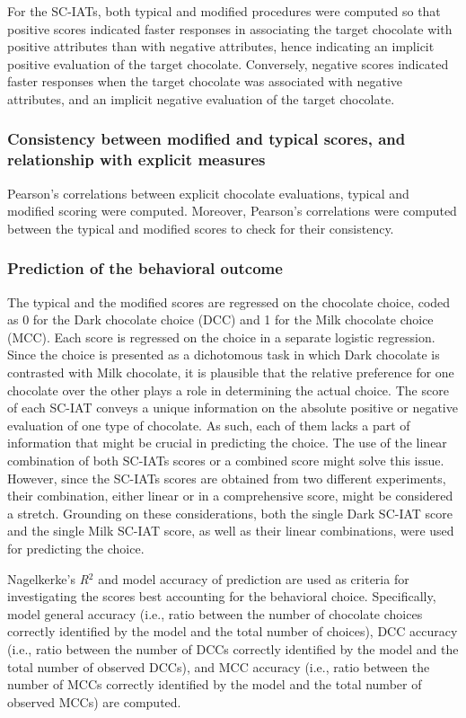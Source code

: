 \documentclass[12pt]{book}
\begin{document}
For the SC-IATs, both typical and modified procedures were computed so that positive scores indicated faster responses in associating the target chocolate with positive attributes than with negative attributes, hence indicating an implicit positive evaluation of the target chocolate. Conversely, negative scores indicated faster responses when the target chocolate was associated with negative attributes, and an implicit negative evaluation of the target chocolate.

\subsubsection{Consistency between modified and typical scores, and relationship with explicit measures}

Pearson's correlations between explicit chocolate evaluations, typical and modified scoring were computed. 
Moreover, Pearson's correlations were computed between the typical and modified scores to check for their consistency. 


\subsubsection{Prediction of the behavioral outcome}\label{subsub:predchoice}

The typical and the modified scores are regressed on the  chocolate choice, coded as 0 for the Dark chocolate choice (DCC) and 1 for the Milk chocolate choice (MCC).
Each score is regressed on the choice in a separate logistic regression. 
Since the choice is presented as a dichotomous task in which Dark chocolate is contrasted with Milk chocolate, it is plausible that the relative preference for one chocolate over the other plays a role in determining the actual choice. 
The score of each SC-IAT conveys a unique information on the absolute positive or negative evaluation of one type of chocolate. As such, each of them lacks a part of information that might be crucial in predicting the choice. 
The use of the linear combination of both SC-IATs scores or a combined score might solve this issue. However, since the SC-IATs scores are obtained from two different experiments, their combination, either linear or in a comprehensive score, might be considered a stretch.
Grounding on these considerations, both the single Dark SC-IAT score and the single Milk SC-IAT score, as well as their linear combinations, were used for predicting the choice.

Nagelkerke’s \emph{R}$^2$ \cite{nagel} and model accuracy of prediction \cite{faraway2006} are used as criteria for investigating the scores best accounting for the behavioral choice. 
Specifically, model general accuracy (i.e., ratio between the number of chocolate choices correctly identified by the model and the total number of choices), DCC accuracy (i.e., ratio between the number of DCCs correctly identified by the model and the total number of observed DCCs), and MCC accuracy (i.e., ratio between the number of MCCs correctly identified by the model and the total number of observed MCCs) are computed.
\end{document}
